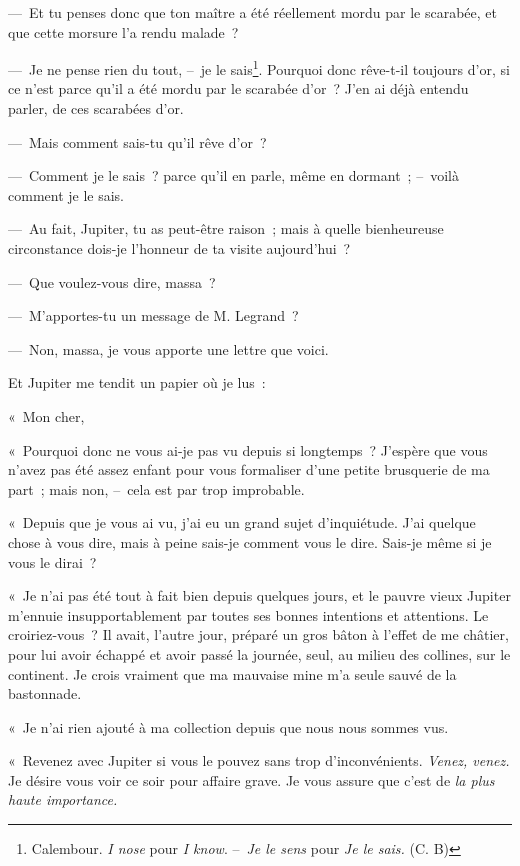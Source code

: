 \documentclass[french,twoside]{book} %
\newcommand{\salute}[1]{\bigbreak{#1}\par\medbreak}
\newcommand{\signed}[1]{\bigbreak\filbreak{\raggedleft #1\par}\medskip}
\newenvironment{quoteblock}%
  {\begin{quoting}}
  {\end{quoting}}
\newenvironment{quotebar}{%
    \def\FrameCommand{{\color{rubric!10!}\vrule width 0.5em} \hspace{0.9em}}%
    \def\OuterFrameSep{\itemsep} %
    \MakeFramed {\advance\hsize-\width \FrameRestore}
  }%
  {%
    \endMakeFramed
  }
\renewenvironment{quoteblock}%
  {%
    \savenotes
    \setstretch{0.9}
    \normalfont
    \begin{quotebar}
  }
  {%
    \end{quotebar}
    \spewnotes
  }
\begin{document}
— Et tu penses donc que ton maître a été réellement mordu par le scarabée, et que cette morsure l’a rendu malade ?\par
— Je ne pense rien du tout, – je le sais\footnote{Calembour. \emph{I nose} pour \emph{I know}. – \emph{Je le sens} pour \emph{Je le sais.} (C. B)}. Pourquoi donc rêve-t-il toujours d’or, si ce n’est parce qu’il a été mordu par le scarabée d’or ? J’en ai déjà entendu parler, de ces scarabées d’or.\par
— Mais comment sais-tu qu’il rêve d’or ?\par
— Comment je le sais ? parce qu’il en parle, même en dormant ; – voilà comment je le sais.\par
— Au fait, Jupiter, tu as peut-être raison ; mais à quelle bienheureuse circonstance dois-je l’honneur de ta visite aujourd’hui ?\par
— Que voulez-vous dire, massa ?\par
— M’apportes-tu un message de M. Legrand ?\par
— Non, massa, je vous apporte une lettre que voici.\par
Et Jupiter me tendit un papier où je lus :\par

\begin{quoteblock}
 \noindent « Mon cher,\par
 « Pourquoi donc ne vous ai-je pas vu depuis si longtemps ? J’espère que vous n’avez pas été assez enfant pour vous formaliser d’une petite brusquerie de ma part ; mais non, – cela est par trop improbable.\par
 « Depuis que je vous ai vu, j’ai eu un grand sujet d’inquiétude. J’ai quelque chose à vous dire, mais à peine sais-je comment vous le dire. Sais-je même si je vous le dirai ?\par
 « Je n’ai pas été tout à fait bien depuis quelques jours, et le pauvre vieux Jupiter m’ennuie insupportablement par toutes ses bonnes intentions et attentions. Le croiriez-vous ? Il avait, l’autre jour, préparé un gros bâton à l’effet de me châtier, pour lui avoir échappé et avoir passé la journée, seul, au milieu des collines, sur le continent. Je crois vraiment que ma mauvaise mine m’a seule sauvé de la bastonnade.\par
 « Je n’ai rien ajouté à ma collection depuis que nous nous sommes vus.\par
 « Revenez avec Jupiter si vous le pouvez sans trop d’inconvénients. \emph{Venez, venez.} Je désire vous voir ce soir pour affaire grave. Je vous assure que c’est de \emph{la plus haute importance.}\par
 
\salute{« Votre tout dévoué,}
 

\signed{« {\scshape William Legrand}. »}
 \end{quoteblock}
\end{document}
